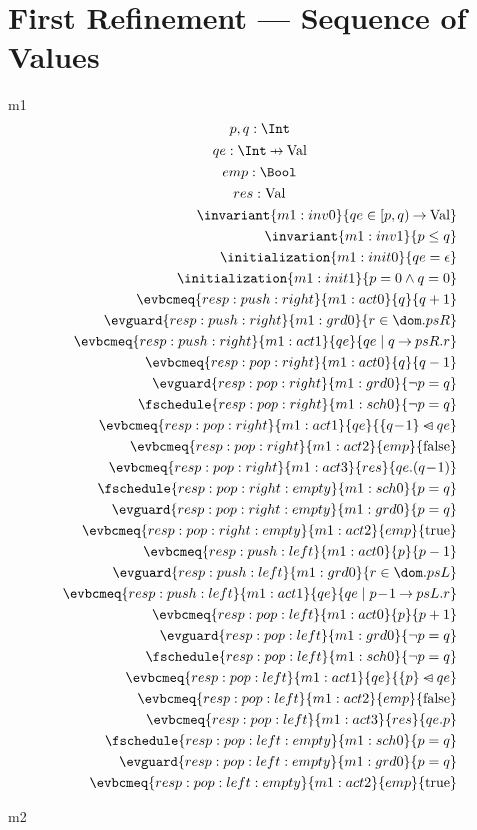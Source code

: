 \documentclass[12pt]{amsart}
\begin{document}
\section{First Refinement --- Sequence of Values}

\begin{machine}{m1}
	\[ \variable{p,q : \Int} \]
	\[ \variable{qe : \Int \pfun \G} \]
	\[ \variable{emp : \Bool } \]
	\[  res : \text{Val}  \]
\begin{align}
	\invariant{m1:inv0}{ qe \in \intervalR{p}{q} \tfun \G } \\
	\invariant{m1:inv1}{ p \le q } \\
	\initialization{m1:init0}{ qe = \emptyfun } \\
	\initialization{m1:init1}{ p = 0 \land q = 0 } \\
	\evbcmeq{resp:push:right}{m1:act0}{q}{q+1} \\
	\evguard{resp:push:right}{m1:grd0}{ r \in \dom.psR } \\
	\evbcmeq{resp:push:right}{m1:act1}{qe}{ qe \1| q \fun psR.r } \\
	\evbcmeq{resp:pop:right}{m1:act0}{q}{q-1} \\
	\evguard{resp:pop:right}{m1:grd0}{\neg p = q} \\
	\fschedule{resp:pop:right}{m1:sch0}{\neg p = q} \\
	\evbcmeq{resp:pop:right}{m1:act1}{qe}{ \{ q\0-1 \} \domsub qe } \\
	\evbcmeq{resp:pop:right}{m1:act2}{emp}{ \false } \\
	\evbcmeq{resp:pop:right}{m1:act3}{res}{ qe.(q\0-1) } \\
	\fschedule{resp:pop:right:empty}{m1:sch0}{ p = q } \\
	\evguard{resp:pop:right:empty}{m1:grd0}{ p = q } \\
	\evbcmeq{resp:pop:right:empty}{m1:act2}{emp}{ \true } \\
	\evbcmeq{resp:push:left}{m1:act0}{p}{p-1} \\
	\evguard{resp:push:left}{m1:grd0}{ r \in \dom.psL } \\
	\evbcmeq{resp:push:left}{m1:act1}{qe}{qe \1| p\0-1 \fun psL.r} \\
	\evbcmeq{resp:pop:left}{m1:act0}{p}{p+1} \\
	\evguard{resp:pop:left}{m1:grd0}{\neg p = q} \\
	\fschedule{resp:pop:left}{m1:sch0}{\neg p = q} \\
	\evbcmeq{resp:pop:left}{m1:act1}{qe}{ \{ p \} \domsub qe } \\
	\evbcmeq{resp:pop:left}{m1:act2}{emp}{ \false } \\
	\evbcmeq{resp:pop:left}{m1:act3}{res}{ qe.p } \\
	\fschedule{resp:pop:left:empty}{m1:sch0}{ p = q } \\
	\evguard{resp:pop:left:empty}{m1:grd0}{ p = q } \\
	\evbcmeq{resp:pop:left:empty}{m1:act2}{emp}{ \true } 
\end{align}
\end{machine}
\begin{machine}{m2}
\end{machine}
\end{document}
